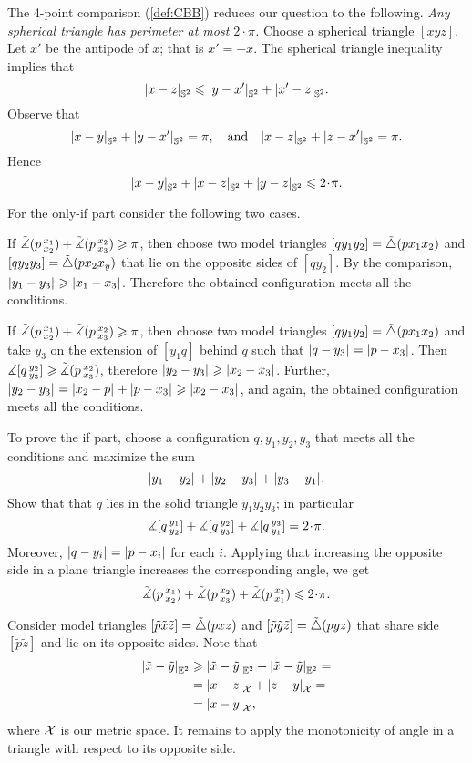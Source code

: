 The 4-point comparison (\ref{def:CBB}) reduces our question to the following.
\textit{Any spherical triangle has perimeter at most $2\cdot\pi$.}
Choose a spherical triangle $[xyz]$.
Let $x'$ be the antipode of $x$; that is $x'=-x$.
The spherical triangle inequality implies that
\[\dist{x}{z}{\mathbb{S}^2}\le \dist{y}{x'}{\mathbb{S}^2}+\dist{x'}{z}{\mathbb{S}^2}.\]
Observe that 
\[
\dist{x}{y}{\mathbb{S}^2}+\dist{y}{x'}{\mathbb{S}^2}=\pi,
\quad\text{and}\quad
\dist{x}{z}{\mathbb{S}^2}+\dist{z}{x'}{\mathbb{S}^2}=\pi.
\]
Hence
\[\dist{x}{y}{\mathbb{S}^2}+\dist{x}{z}{\mathbb{S}^2}+\dist{y}{z}{\mathbb{S}^2}\le2\cdot \pi.\]

 For the only-if part consider the following two cases.

If $\tilde\measuredangle(p\,{}^{x_1}_{x_2})+\tilde\measuredangle(p\,{}^{x_2}_{x_3})\geqslant \pi$, then choose two model triangles $[qy_1y_2]\z=\modtrig(px_1x_2)$ and $[qy_2y_3]=\tilde\triangle(px_2x_y)$ that lie on the opposite sides of $[qy_2]$.
By the comparison, $\dist{y_1}{y_3}{}\ge \dist{x_1}{x_3}{}$.
Therefore the obtained configuration meets all the conditions.

If $\tilde\measuredangle(p\,{}^{x_1}_{x_2})+\tilde\measuredangle(p\,{}^{x_2}_{x_3})\geqslant \pi$, then choose two model triangles $[qy_1y_2]\z=\modtrig(px_1x_2)$
and take $y_3$ on the extension of $[y_1q]$ behind $q$ such that $\dist{q}{y_3}{}=\dist{p}{x_3}{}$.
Then $\measuredangle [q\,{}^{y_2}_{y_3}]\geqslant \tilde\measuredangle(p\,{}^{x_2}_{x_3})$, therefore $\dist{y_2}{y_3}{}\ge \dist{x_2}{x_3}{}$.
Further, $\dist{y_2}{y_3}{}=\dist{x_2}{p}{}+\dist{p}{x_3}{} \ge \dist{x_2}{x_3}{}$,
and again, the obtained configuration meets all the conditions.

To prove the if part, choose a configuration $q,y_1,y_2,y_3$ that meets all the conditions and maximize the sum
\[\dist{y_1}{y_2}{}+\dist{y_2}{y_3}{}+\dist{y_3}{y_1}{}.\]
Show that that $q$ lies in the solid triangle $y_1y_2y_3$;
in particular 
\[\mangle \hinge q{y_1}{y_2}+\mangle \hinge q{y_2}{y_3}+ \mangle \hinge q{y_3}{y_1}=2\cdot\pi.\]
Moreover, $\dist{q}{y_i}{}=\dist{p}{x_i}{}$ for each $i$.
Applying that increasing the opposite side in a plane triangle increases the corresponding angle, we get 
\[\angk  p{x_1}{x_2}+\angk p{x_2}{x_3}+\angk p{x_3}{x_1}
\le 
2\cdot\pi.
\]

Consider model triangles $[\tilde p\tilde x\tilde z]=\tilde\triangle(pxz)$ and $[\tilde p\tilde y\tilde z]=\tilde\triangle(pyz)$
that share side $[\tilde p\tilde z]$ and lie on its opposite sides.
Note that 
\begin{align*}
\dist{\tilde x}{\tilde y}{\EE^2}
&\ge \dist{\tilde x}{\tilde y}{\EE^2}+\dist{\tilde x}{\tilde y}{\EE^2}=
\\
&=\dist{x}{z}{\spc{X}}+\dist{z}{y}{\spc{X}}=
\\
&=\dist{x}{y}{\spc{X}},
\end{align*}
where $\mathcal{X}$ is our metric space.
It remains to apply the monotonicity of angle in a triangle with respect to its opposite side. 


